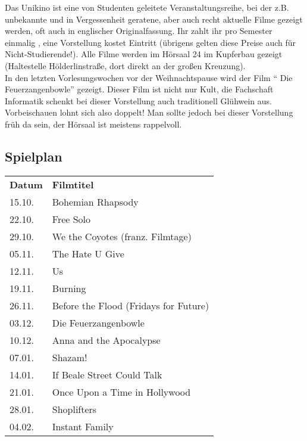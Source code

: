 Das Unikino ist eine von Studenten geleitete Veranstaltungsreihe, bei der z.B. unbekannte und in Vergessenheit geratene, aber auch recht aktuelle Filme gezeigt werden, oft auch in englischer Originalfassung. Ihr zahlt ihr pro Semester einmalig , eine Vorstellung kostet  Eintritt (übrigens gelten diese Preise auch für Nicht-Studierende!). Alle Filme werden im Hörsaal 24 im Kupferbau gezeigt (Haltestelle Hölderlinstraße, dort direkt an der großen Kreuzung).\\
In den letzten Vorlesungswochen vor der Weihnachtspause wird der Film "` Die Feu\-er\-zang\-en\-bow\-le"' gezeigt. Dieser Film ist nicht nur Kult, die Fachschaft Informatik schenkt bei dieser Vorstellung auch traditionell Glühwein aus. Vorbeischauen lohnt sich also doppelt! Man sollte jedoch bei dieser Vorstellung früh da sein, der Hörsaal ist meistens rappelvoll.

\subsection*{Spielplan}
\renewcommand{\arraystretch}{1.2}
\begin{tabular}{l l}
\textbf{Datum} & \textbf{Filmtitel}     			\\
15.10. & Bohemian Rhapsody							\\
22.10. & Free Solo									\\
29.10. & We the Coyotes (franz. Filmtage)			\\
05.11. & The Hate U Give							\\
12.11. & Us											\\
19.11. & Burning									\\
26.11. & Before the Flood (Fridays for Future)		\\
03.12. & Die Feuerzangenbowle						\\
10.12. & Anna and the Apocalypse					\\
07.01. & Shazam!									\\
14.01. & If Beale Street Could Talk					\\
21.01. & Once Upon a Time in Hollywood				\\
28.01. & Shoplifters								\\
04.02. & Instant Family								\\

\end{tabular}

